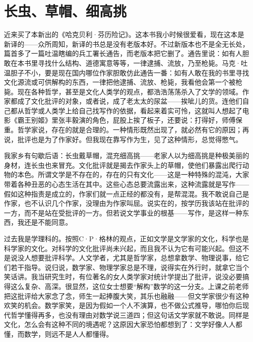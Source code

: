 \chapter{长虫、草帽、细高挑}

近来买了本新出的《哈克贝利·芬历险记》。这本书我小时候很爱看，现在这本是新译的——众所周知，新译的书总是没有老版本好。不过新版本也不是全无长处，篇首多了一篇吐温瞎编的兵工署长通告，而老版本把它删了。通告里说：如有人胆敢在本书里寻找什么结构、道德寓意等等，一律逮捕、流放，乃至枪毙。马克·吐温胆子不小，要是现在国内哪位作家胆敢仿此通告一番：如有人敢在我的书里寻找文化源流或可供解构的东西，一律把他逮捕、流放、枪毙，我看他会第一个被枪毙。现在各种哲学，甚至是文化人类学的观点，都浩浩荡荡杀入了文学的领域。作家都成了文化批评的对象，或者说，成了老太太的尿盆——挨呲儿的货。连他们自己都从哲学或人类学上给自己找写作的依据，看起来着实可怜，这就叫人想起了电影《霸王别姬》里张丰毅演的角色，屁股上挨了板子，还要说：打得好，师傅保重。哲学家说，存在的就是合理的。一种情形既然出现了，就必然有它的原因；再说，批评也是为了作家好。但我现在靠写作为生，见了这种情形，总觉得憋气。 

我家乡有句歇后语：长虫戴草帽，混充细高挑——老家人以为细高挑是种极美丽的身材，连长虫也来冒充。文化批评就是揭去作家头上的草帽，使他们暴露出爬行动物的本色。所谓文学是不存在的，存在的只有文化——这是一种特殊的混沌，大家带着各种丑恶的心态生活在其中。这些心态总要流露出来，这种流露就是写作——假如这种指责是成立的，作家们就一点正经的都没有，是帮混混。我不敢说自己是作家，也不认识几个作家，没理由为作家叫屈。说实在的，按学历我该站在批评的一方，而不是站在受批评的一方。但若说文学事业的根基——写作，是这样一种东西，我还是不能同意。 

过去我是学理科的。按照C·P·格林的观点，正如文学是文学家的文化，科学也是科学家的文化。对科学的文化批评尚未兴起，而且我不认为它有可能兴起。但这不是说没人想要批评科学。人文学者，尤其是哲学家，总想拿数学、物理说事，给它们若干指导。说归说，数学家、物理学家总是不理，说得实在外行时，就拿它当个笑话讲。我当研究生时，有位著名的女人类学家对统计学提出了批评，说没必要搞得这么复杂、高深。很显然，这位女士想要“解构”数学的这一分支。上课之前老师把这批评给大家念了念，师生一起捧腹大笑，其乐也融融——但文学家很少有这种欢笑的机会。数学家笑，是因为假如一个人不演算，也不做公式推导，哪怕你后现代哲学懂得再多，也没有理由对数学说三道四；但这句话文学家就不敢说。同样是文化，怎么会有这种不同的境遇呢？这原因大家恐怕都想到了：文学好像人人都懂，而数学，则远不是人人都懂得。 

